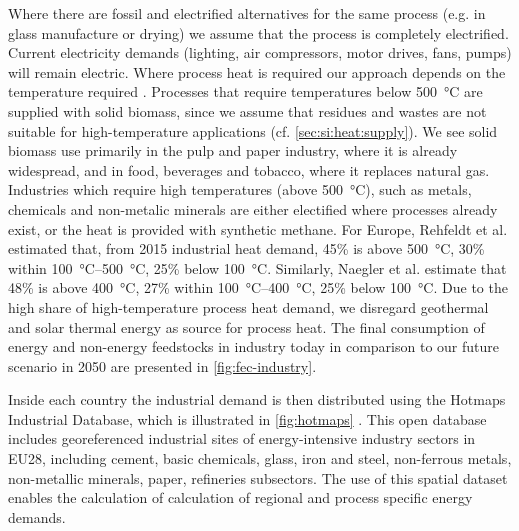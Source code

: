 Where there are fossil and electrified alternatives for the same process (e.g.
in glass manufacture or drying) we assume that the process is completely
electrified. Current electricity demands (lighting, air compressors, motor
drives, fans, pumps) will remain electric. Where process heat is required our
approach depends on the temperature required
.
Processes that require temperatures below \SI{500}{\celsius} are supplied with
solid biomass, since we assume that residues and wastes are not suitable for
high-temperature applications (cf. \cref{sec:si:heat:supply}). We see solid
biomass use primarily in the pulp and paper industry, where it is already
widespread, and in food, beverages and tobacco, where it replaces natural gas.
Industries which require high temperatures (above \SI{500}{\celsius}), such as
metals, chemicals and non-metalic minerals are either electified where processes
already exist, or the heat is provided with synthetic methane. For Europe,
Rehfeldt et al.  estimated that, from 2015
industrial heat demand, 45\% is above \SI{500}{\celsius}, 30\% within
\SIrange{100}{500}{\celsius}, 25\% below \SI{100}{\celsius}. Similarly, Naegler
et al.  estimate that 48\% is above
\SI{400}{\celsius}, 27\% within \SIrange{100}{400}{\celsius}, 25\% below
\SI{100}{\celsius}. Due to the high share of high-temperature process heat
demand, we disregard geothermal and solar thermal energy as source for process
heat. The final consumption of energy and non-energy feedstocks in industry
today in comparison to our future scenario in 2050 are presented in
\cref{fig:fec-industry}.

Inside each country the industrial demand is then distributed using the Hotmaps
Industrial Database, which is illustrated in \cref{fig:hotmaps} . This
open database includes georeferenced industrial sites of energy-intensive
industry sectors in EU28, including cement, basic chemicals, glass, iron and
steel, non-ferrous metals, non-metallic minerals, paper, refineries subsectors.
The use of this spatial dataset enables the calculation of calculation of
regional and process specific energy demands.


